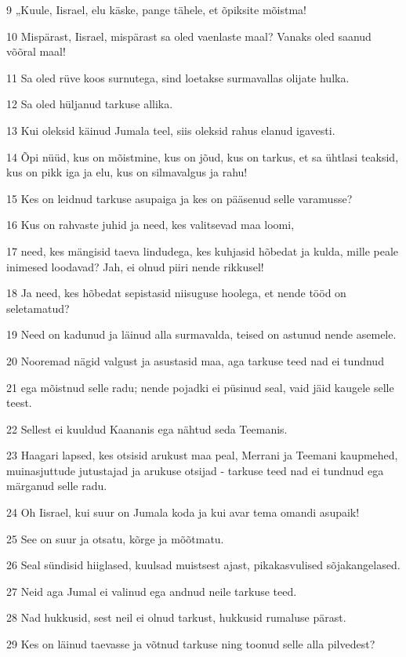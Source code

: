 \par 9 „Kuule, Iisrael, elu käske, pange tähele, et õpiksite mõistma!
\par 10 Mispärast, Iisrael, mispärast sa oled vaenlaste maal? Vanaks oled saanud võõral maal!
\par 11 Sa oled rüve koos surnutega, sind loetakse surmavallas olijate hulka.
\par 12 Sa oled hüljanud tarkuse allika.
\par 13 Kui oleksid käinud Jumala teel, siis oleksid rahus elanud igavesti.
\par 14 Õpi nüüd, kus on mõistmine, kus on jõud, kus on tarkus, et sa ühtlasi teaksid, kus on pikk iga ja elu, kus on silmavalgus ja rahu!
\par 15 Kes on leidnud tarkuse asupaiga ja kes on pääsenud selle varamusse?
\par 16 Kus on rahvaste juhid ja need, kes valitsevad maa loomi,
\par 17 need, kes mängisid taeva lindudega, kes kuhjasid hõbedat ja kulda, mille peale inimesed loodavad? Jah, ei olnud piiri nende rikkusel!
\par 18 Ja need, kes hõbedat sepistasid niisuguse hoolega, et nende tööd on seletamatud?
\par 19 Need on kadunud ja läinud alla surmavalda, teised on astunud nende asemele.
\par 20 Nooremad nägid valgust ja asustasid maa, aga tarkuse teed nad ei tundnud
\par 21 ega mõistnud selle radu; nende pojadki ei püsinud seal, vaid jäid kaugele selle teest.
\par 22 Sellest ei kuuldud Kaananis ega nähtud seda Teemanis.
\par 23 Haagari lapsed, kes otsisid arukust maa peal, Merrani ja Teemani kaupmehed, muinasjuttude jutustajad ja arukuse otsijad - tarkuse teed nad ei tundnud ega märganud selle radu.
\par 24 Oh Iisrael, kui suur on Jumala koda ja kui avar tema omandi asupaik!
\par 25 See on suur ja otsatu, kõrge ja mõõtmatu.
\par 26 Seal sündisid hiiglased, kuulsad muistsest ajast, pikakasvulised sõjakangelased.
\par 27 Neid aga Jumal ei valinud ega andnud neile tarkuse teed.
\par 28 Nad hukkusid, sest neil ei olnud tarkust, hukkusid rumaluse pärast.
\par 29 Kes on läinud taevasse ja võtnud tarkuse ning toonud selle alla pilvedest?
